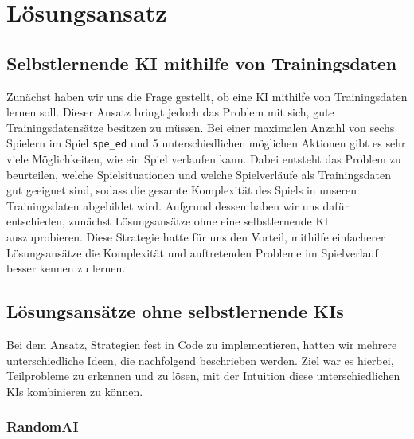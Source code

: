 \chapter{Lösungsansatz}
\label{ch:loesungsansatz}



\section{Selbstlernende KI mithilfe von Trainingsdaten}
\label{sec:selbstlernende-ki-trainingsdaten}

Zunächst haben wir uns die Frage gestellt, ob eine \ac{KI} mithilfe von Trainingsdaten lernen soll.
Dieser Ansatz bringt jedoch das Problem mit sich, gute Trainingsdatensätze besitzen zu müssen.
Bei einer maximalen Anzahl von sechs Spielern im Spiel \texttt{spe\_ed} und 5 unterschiedlichen möglichen Aktionen gibt
es sehr viele Möglichkeiten, wie ein Spiel verlaufen kann.
Dabei entsteht das Problem zu beurteilen, welche Spielsituationen und welche Spielverläufe als Trainingsdaten gut
geeignet sind, sodass die gesamte Komplexität des Spiels in unseren Trainingsdaten abgebildet wird.
Aufgrund dessen haben wir uns dafür entschieden, zunächst Lösungsansätze ohne eine selbstlernende \ac{KI}
auszuprobieren.
Diese Strategie hatte für uns den Vorteil, mithilfe einfacherer Lösungsansätze die Komplexität und auftretenden Probleme
im Spielverlauf besser kennen zu lernen. 


\section{Lösungsansätze ohne selbstlernende KIs}
\label{sec:loesungsansatz-ohne-selbstlernende-kis}

Bei dem Ansatz, Strategien fest in Code zu implementieren, hatten wir mehrere unterschiedliche Ideen,
die nachfolgend beschrieben werden.
Ziel war es hierbei, Teilprobleme zu erkennen und zu lösen, mit der Intuition diese unterschiedlichen \ac{KI}s
kombinieren zu können.

\subsection{RandomAI}
\label{subsec:random-ai}


